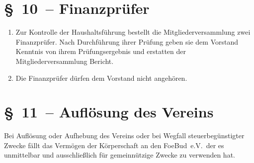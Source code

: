 \documentclass[11pt,DIV12]{scrartcl}
\begin{document}
\section*{§~10~-- Finanzprüfer}
\begin{enumerate}
\item Zur Kontrolle der Haushaltsführung bestellt die Mitgliederversammlung zwei Finanzprüfer. Nach Durchführung ihrer Prüfung geben sie dem Vorstand Kenntnis von ihrem Prüfungsergebnis und erstatten der Mitgliederversammlung Bericht.
\item Die Finanzprüfer dürfen dem Vorstand nicht angehören.
\end{enumerate}

\section*{§~11~-- Auflösung des Vereins}
Bei Auflösung oder Aufhebung des Vereins oder bei Wegfall steuerbegünstigter Zwecke fällt das Vermögen der Körperschaft an den FoeBud~e.V.\ der es unmittelbar und ausschließlich für gemeinnützige Zwecke zu verwenden hat.
\end{document}
